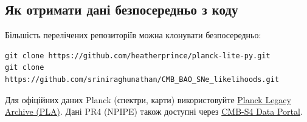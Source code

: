 \subsection*{Як отримати дані безпосередньо з коду}

Більшість перелічених репозиторіїв можна клонувати безпосередньо:
\begin{verbatim}
git clone https://github.com/heatherprince/planck-lite-py.git
git clone https://github.com/sriniraghunathan/CMB_BAO_SNe_likelihoods.git
\end{verbatim}

Для офіційних даних Planck (спектри, карти) використовуйте
\href{https://pla.esac.esa.int/pla}{Planck Legacy Archive (PLA)}.
Дані PR4 (NPIPE) також доступні через
\href{https://data.cmb-s4.org/planck_pr4.html}{CMB-S4 Data Portal}.